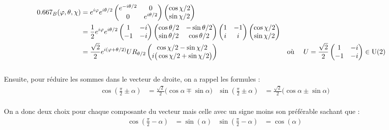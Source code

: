 \begin{align*}
	\x_B(\varphi, \theta, \chi) &= e^{i\varphi} e^{i\theta/2}\begin{pmatrix}
		e^{-i\theta/2} & 0 \\
		0 & e^{i\theta/2}
	\end{pmatrix}\begin{pmatrix} 
		\cos \chi/2 \\ 
		\sin \chi/2 
	\end{pmatrix} \\
	&= \frac{1}{2}e^{i\varphi} e^{i\theta/2}\begin{pmatrix} 
		1 & -i \\
		-1 & -i
	\end{pmatrix}\begin{pmatrix} 
		\cos \theta/2 & -\sin \theta/2 \\ 
		\sin \theta/2 & \cos \theta/2 
	\end{pmatrix} \begin{pmatrix} 
		1 & -1 \\ i & i
	\end{pmatrix}\begin{pmatrix} 
		\cos \chi/2 \\ 
		\sin\chi/2
	\end{pmatrix} \\
	&= \frac{\sqrt{2}}{2}e^{i(\varphi + \theta/2)}U R_{\theta/2} \begin{pmatrix} 
		\cos \chi/2 - \sin\chi/2 \\ 
		i\big(\cos\chi/2 + \sin\chi/2\big)
	\end{pmatrix}   & &\text{où }\quad U = \frac{\sqrt{2}}{2}\begin{pmatrix} 
		1 & -i \\ -1 & -i
	\end{pmatrix}\in \U{2} \\
\end{align*}
\\
Ensuite, pour réduire les sommes dans le vecteur de droite, on a rappel les formules :
\begin{align*}
	\cos\left( \frac{\pi}{2} \pm \alpha\right) &= \frac{\sqrt{2}}{2}\big( \cos\alpha \mp \sin \alpha \big) & \sin\left( \frac{\pi}{2} \pm \alpha\right) &= \frac{\sqrt{2}}{2}\big( \cos\alpha \pm \sin \alpha \big)
\end{align*}
\\ 
On a donc deux choix pour chaque composante du vecteur mais celle avec un signe moins son préférable sachant que : 
\begin{align*}
	\cos\left( \frac{\pi}{2} - \alpha\right) &= \sin(\alpha) &  \sin\left( \frac{\pi}{2} - \alpha\right) &= \cos(\alpha)
\end{align*}
